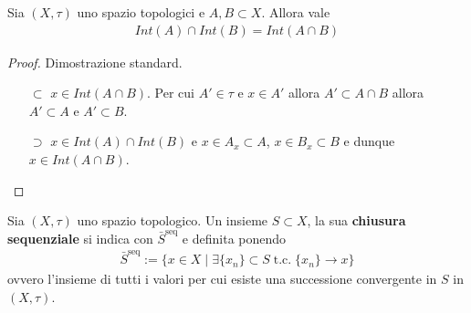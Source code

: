 \begin{proposition}
	Sia $(X,\tau)$ uno spazio topologici e $A, B \subset X$. Allora vale 
	\begin{equation}
	\begin{aligned}
		Int(A) \cap Int(B) = Int(A \cap B)
	\end{aligned}
	\end{equation}
\end{proposition}
\begin{proof}
	Dimostrazione standard.
	\begin{enumerate}
		\item[$\subset$]  $x \in Int(A \cap B)$. Per cui $A' \in \tau$ e $x \in A'$ allora $A' \subset A \cap B$ allora $A' \subset A$ e $A' \subset B$.  
		\item[$\supset$] $x \in Int(A) \cap Int(B)$ e $x \in A_x \subset A$, $x \in B_x \subset B$ e dunque $x \in Int(A \cap B)$.
	\end{enumerate}
\end{proof}


\begin{definition}
	Sia $(X,\tau)$ uno spazio topologico. Un insieme $S \subset X$, la sua \textbf{chiusura sequenziale} si indica con $\bar{S}^\text{seq}$ e definita ponendo
	\begin{equation}
	\begin{aligned}
		\bar{S}^\text{seq} := \{x \in X \; | \; \exists\{x_n\} \subset S \; \text{t.c.} \; \{x_n\} \rightarrow x \}
	\end{aligned}
	\end{equation}
	ovvero l'insieme di tutti i valori per cui esiste una successione convergente in $S$ in $(X, \tau)$.
\end{definition}

